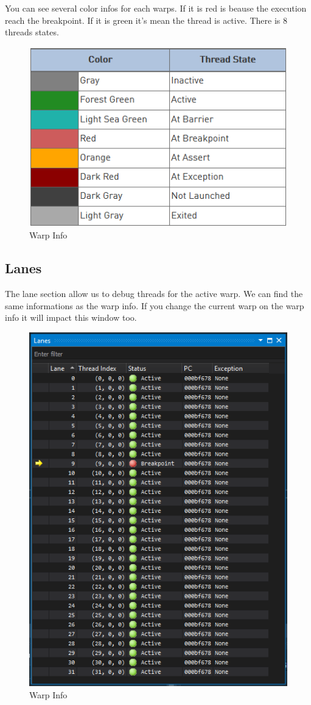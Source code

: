 \documentclass{article}
\begin{document}
You can see several color infos for each warps. If it is red is beause the execution reach the breakpoint. If it is green it's mean the thread is active. There is 8 threads states.

\begin{figure}[h]
	\centering
	\includegraphics[scale=0.6]{figures/threadstate.png}
	\caption{Warp Info}
\end{figure}

\newpage
\subsection{Lanes}
The lane section allow us to debug threads for the active warp. We can find the same informations as the warp info. If you change the current warp on the warp info it will impact this window too.
\begin{figure}[h]
	\centering
	\includegraphics[scale=0.6]{figures/lanes.png}
	\caption{Warp Info}
\end{figure}
\end{document}
